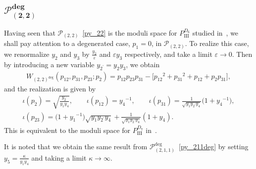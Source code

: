 \documentclass[10pt,a4paper]{amsart}
\numberwithin{equation}{section}
\begin{document}
\subsection[$\mathcal{P}_{(2,2)}^{\text{deg}}$]{$\boldsymbol{\mathcal{P}_{(2,2)}^{\text{deg}}}$}
Having seen that $\mathcal{P}_{(2,2)}$~\eqref{py_22} is the moduli space for $P_{\mathrm{III}}^{D_6}$ studied in~\cite{vdPutSaito09a}, we shall pay attention to a degenerated case, $p_1=0$, in $\mathcal{P}_{(2,2)}$. To realize this case, we renormalize $y_2$ and $y_3$ by $\frac{y_2}{\varepsilon}$ and $\varepsilon y_3$ respectively, and take a limit $\varepsilon\to 0$. Then by introducing a new variable $y_{2^\prime} = y_2 y_3$, we obtain
\begin{gather*}
 W_{(2,2)^{\text{deg}}}(p_{12}, p_{31}, p_{23}; p_2) = p_{12} p_{23} p_{31} - \big[ {p_{12}}^2 + {p_{31}}^2 + p_{12} + p_2 p_{31} \big] ,
\end{gather*}
and the realization is given by
\begin{gather}
 \iota(p_2) = \sqrt{\frac{y_{2^\prime}}{y_1 y_4}} ,\qquad \iota(p_{12}) = {y_4}^{-1}, \qquad
 \iota(p_{31}) = \frac{1}{\sqrt{y_1 y_{2^\prime} y_4}} \big(1+{y_4}^{-1}\big),\nonumber \\
 \iota(p_{23}) = \big( 1 + {y_1}^{-1} \big) \sqrt{y_1 y_{2^\prime} y_4} + \frac{1}{\sqrt{y_1 y_{2^\prime} y_4} }(1+y_4) . \label{py_22deg}
\end{gather}
This is equivalent to the moduli space for $P_{\mathrm{III}}^{D_7}$ in~\cite{vdPutSaito09a}.

It is noted that we obtain the same result from $\mathcal{P}_{(2,1,1)}^{\text{deg}}$~\eqref{py_211deg} by setting $y_5=\frac{\kappa}{y_1 y_4}$ and taking a limit $\kappa\to\infty$.
\end{document}
